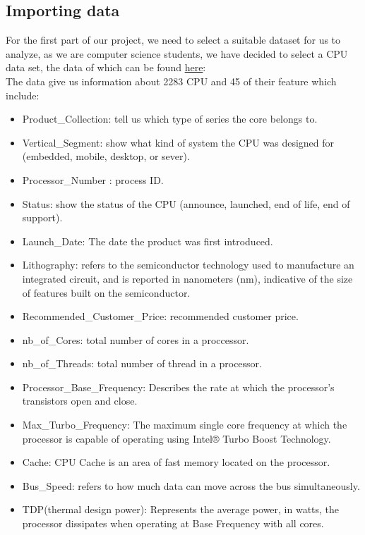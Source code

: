 \subsection{Importing data}
For the first part of our project, we need to select a suitable dataset for us to analyze, as we are computer science students, we have decided to select a CPU data set, the data of which can be found \href{https://www.kaggle.com/datasets/iliassekkaf/computerparts?select=Intel_CPUs.csv}{here}:
\\
The data give us information about 2283 CPU and 45 of their feature which include:
\\
\begin{itemize}
    \item Product\_Collection: tell us which type of series the core belongs to.
    \item Vertical\_Segment: show what kind of system the CPU was designed for (embedded, mobile, desktop, or sever).
    \item Processor\_Number	: process ID.
    \item Status: show the status of the CPU (announce, launched, end of life, end of support).
    \item Launch\_Date: The date the product was first introduced. 
    \item Lithography: refers to the semiconductor technology used to manufacture an integrated circuit, and is reported in nanometers (nm), indicative of the size of features built on the semiconductor. 
    \item Recommended\_Customer\_Price: recommended customer price. 
    \item nb\_of\_Cores: total number of cores in a proccessor. 
    \item nb\_of\_Threads: total number of thread in a processor. 
    \item Processor\_Base\_Frequency: Describes the rate at which the processor's transistors open and close.
    \item Max\_Turbo\_Frequency: The maximum single core frequency at which the processor is capable of operating using Intel® Turbo Boost Technology. 
    \item Cache: CPU Cache is an area of fast memory located on the processor. 
    \item Bus\_Speed: refers to how much data can move across the bus simultaneously.
    \item TDP(thermal design power): Represents the average power, in watts, the processor dissipates when operating at Base Frequency with all cores. 

\end{itemize}
